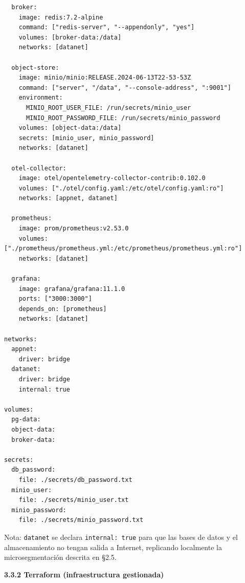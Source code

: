 \documentclass{article}
\newcommand{\mdhfour}[1]{\par\medskip\noindent\textbf{#1}\par\nobreak\smallskip}
\begin{document}
\begin{lstlisting}
  broker:
    image: redis:7.2-alpine
    command: ["redis-server", "--appendonly", "yes"]
    volumes: [broker-data:/data]
    networks: [datanet]

  object-store:
    image: minio/minio:RELEASE.2024-06-13T22-53-53Z
    command: ["server", "/data", "--console-address", ":9001"]
    environment:
      MINIO_ROOT_USER_FILE: /run/secrets/minio_user
      MINIO_ROOT_PASSWORD_FILE: /run/secrets/minio_password
    volumes: [object-data:/data]
    secrets: [minio_user, minio_password]
    networks: [datanet]

  otel-collector:
    image: otel/opentelemetry-collector-contrib:0.102.0
    volumes: ["./otel/config.yaml:/etc/otel/config.yaml:ro"]
    networks: [appnet, datanet]

  prometheus:
    image: prom/prometheus:v2.53.0
    volumes: ["./prometheus/prometheus.yml:/etc/prometheus/prometheus.yml:ro"]
    networks: [datanet]

  grafana:
    image: grafana/grafana:11.1.0
    ports: ["3000:3000"]
    depends_on: [prometheus]
    networks: [datanet]

networks:
  appnet:
    driver: bridge
  datanet:
    driver: bridge
    internal: true

volumes:
  pg-data:
  object-data:
  broker-data:

secrets:
  db_password:
    file: ./secrets/db_password.txt
  minio_user:
    file: ./secrets/minio_user.txt
  minio_password:
    file: ./secrets/minio_password.txt
\end{lstlisting}

Nota: \texttt{datanet} se declara \texttt{internal:\allowbreak{} true} para que las bases de datos y el almacenamiento no tengan salida a Internet, replicando localmente la microsegmentación descrita en \S{}2.5.

\mdhfour{3.3.2 Terraform (infraestructura gestionada)}
\end{document}
